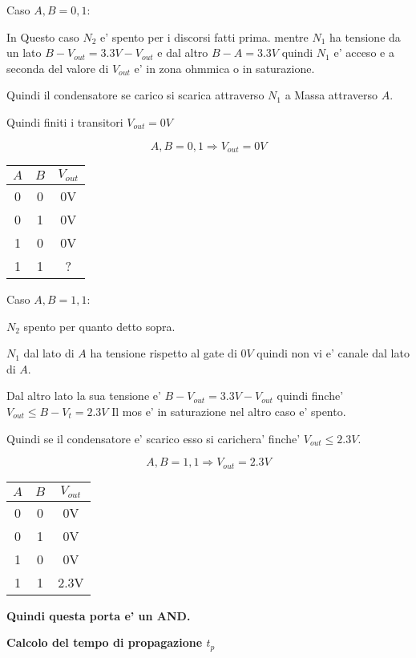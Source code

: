 \documentclass[\main/main.tex]{subfiles}
\begin{document}
Caso $A,B = 0,1$:

In Questo caso $N_2$ e' spento per i discorsi fatti prima.
mentre  $N_1$ ha tensione da un lato $B - V_{out} = 3.3V - V_{out}$ e dal altro $B - A = 3.3V$
quindi $N_1$ e' acceso e a seconda del valore di $V_{out}$ e' in zona ohmmica o in saturazione.

Quindi il condensatore se carico si scarica attraverso $N_1$ a Massa attraverso $A$.

Quindi finiti i transitori $V_{out} = 0V$

\[A,B = 0,1 \Rightarrow V_{out} = 0V\]
\begin{center}
	\begin{tabular}{ c  c | c}
		$A$ & $B$ & $V_{out}$ \\
		\hline
		0   & 0   & 0V        \\
		0   & 1   & 0V        \\
		1   & 0   & 0V        \\
		1   & 1   & ?         \\
	\end{tabular}
\end{center}

Caso $A,B = 1,1$:

$N_2$ spento per quanto detto sopra.

$N_1$ dal lato di $A$ ha tensione rispetto al gate di $0V$ quindi non vi e' canale dal lato di $A$.

Dal altro lato la sua tensione e' $B - V_{out} = 3.3V - V_{out}$ quindi finche' $V_{out} \leq B - V_{t} = 2.3V$ Il mos e' in saturazione nel altro caso e' spento.

Quindi se il condensatore e' scarico esso si carichera' finche' $V_{out} \leq 2.3V$.

\[A,B = 1,1 \Rightarrow V_{out} = 2.3V\]
\begin{center}
	\begin{tabular}{ c  c | c}
		$A$ & $B$ & $V_{out}$ \\
		\hline
		0   & 0   & 0V        \\
		0   & 1   & 0V        \\
		1   & 0   & 0V        \\
		1   & 1   & 2.3V      \\
	\end{tabular}
\end{center}

\textbf{Quindi questa porta e' un AND.}

\textbf{Calcolo del tempo di propagazione $t_p$}
\end{document}
